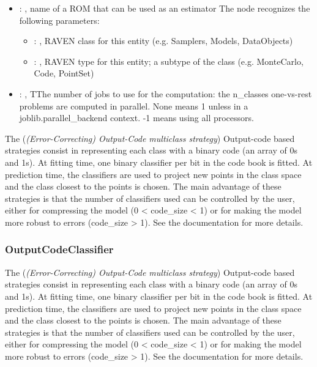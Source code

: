 \begin{itemize}
    \item {}: , 
      name of a ROM that can be used as an estimator
      The  node recognizes the following parameters:
        \begin{itemize}
          \item {}: , 
            RAVEN class for this entity (e.g. Samplers, Models, DataObjects)
          \item {}: , 
            RAVEN type for this entity; a subtype of the class (e.g. MonteCarlo, Code, PointSet)
      \end{itemize}

    \item {}: , 
      TThe number of jobs to use for the computation: the n\_classes one-vs-rest
      problems are computed in parallel. None means 1 unless in a joblib.parallel\_backend
      context. -1 means using all processors.
  \end{itemize}
 The  (\textit{(Error-Correcting) Output-Code multiclass strategy})
 Output-code based strategies consist in representing each class with a binary code (an array of
 0s and 1s). At fitting time, one binary classifier per bit in the code book is fitted. At
 prediction time, the classifiers are used to project new points in the class space and the class
 closest to the points is chosen. The main advantage of these strategies is that the number of
 classifiers used can be controlled by the user, either for compressing the model
 (0 < code\_size < 1) or for making the model more robust to errors (code\_size > 1). See the
 documentation for more details.

\subsubsection{OutputCodeClassifier}
  The  (\textit{(Error-Correcting) Output-Code multiclass strategy})
  Output-code based strategies consist in representing each class with a binary code (an array of
  0s and 1s). At fitting time, one binary classifier per bit in the code book is fitted. At
  prediction time, the classifiers are used to project new points in the class space and the class
  closest to the points is chosen. The main advantage of these strategies is that the number of
  classifiers used can be controlled by the user, either for compressing the model
  (0 < code\_size < 1) or for making the model more robust to errors (code\_size > 1). See the
  documentation for more details.

